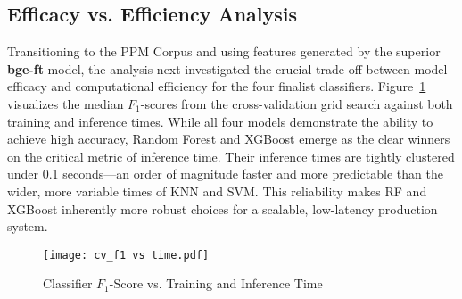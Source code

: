 \subsection{Efficacy vs. Efficiency Analysis}\label{ch:4.5.2}
Transitioning to the PPM Corpus and using features generated by the superior \textbf{bge-ft} model, the analysis next investigated the crucial trade-off between model efficacy and computational efficiency for the four finalist classifiers. Figure~\ref{fig:f1time} visualizes the median \(F_1\)-scores from the cross-validation grid search against both training and inference times. While all four models demonstrate the ability to achieve high accuracy, Random Forest and XGBoost emerge as the clear winners on the critical metric of inference time. Their inference times are tightly clustered under 0.1 seconds—an order of magnitude faster and more predictable than the wider, more variable times of KNN and SVM. This reliability makes RF and XGBoost inherently more robust choices for a scalable, low-latency production system.
\begin{figure}[tb]
    \captionsetup{skip=5pt}
    \centering
    \texttt{[image: cv\_f1 vs time.pdf]}
    \caption{Classifier \(F_1\)-Score vs. Training and Inference Time}
    \label{fig:f1time}
\end{figure}

